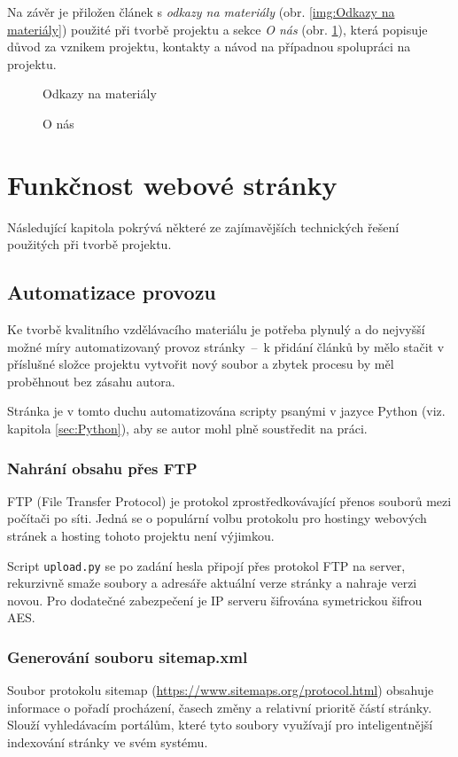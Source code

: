 \documentclass[a4paper, 12pt]{article}
\begin{document}
  Na závěr je přiložen článek s \emph{odkazy na materiály} (obr. \ref{img:Odkazy na materiály}) použité při tvorbě projektu a sekce \emph{O nás} (obr. \ref{img:O nás}), která popisuje důvod za vznikem projektu, kontakty a návod na případnou spolupráci na projektu.

  \begin{figure}[H]
      \caption{Odkazy na materiály} \label{img:Odkazy na materiály}
    \endminipage\hfill
      \caption{O nás} \label{img:O nás}
    \endminipage
  \end{figure}


  \section{Funkčnost webové stránky}
  Následující kapitola pokrývá některé ze zajímavějších technických řešení použitých při tvorbě projektu.


  \subsection{Automatizace provozu} \label{sec:Automatizace provozu}
  Ke tvorbě kvalitního vzdělávacího materiálu je potřeba plynulý a do nejvyšší možné míry automatizovaný provoz stránky~--~k přidání článků by mělo stačit v příslušné složce projektu vytvořit nový soubor a zbytek procesu by měl proběhnout bez zásahu autora.

  Stránka je v tomto duchu automatizována scripty psanými v jazyce Python (viz. kapitola \ref{sec:Python}), aby se autor mohl plně soustředit na práci.


  \subsubsection{Nahrání obsahu přes FTP}
  FTP (File Transfer Protocol) je protokol zprostředkovávající přenos souborů mezi počítači po síti. Jedná se o populární volbu protokolu pro hostingy webových stránek a hosting tohoto projektu není výjimkou.

  Script \texttt{upload.py} se po zadání hesla připojí přes protokol FTP na server, rekurzivně smaže soubory a adresáře aktuální verze stránky a nahraje verzi novou. Pro dodatečné zabezpečení je IP serveru šifrována symetrickou šifrou AES.


  \subsubsection{Generování souboru sitemap.xml}
  Soubor protokolu sitemap (\url{https://www.sitemaps.org/protocol.html}) obsahuje informace o pořadí procházení, časech změny a relativní prioritě částí stránky. Slouží vyhledávacím portálům, které tyto soubory využívají pro inteligentnější indexování stránky ve svém systému.
\end{document}
